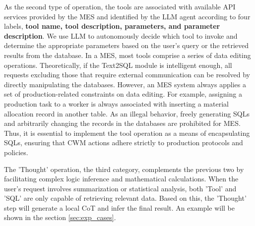 \documentclass[preprint,12pt]{elsarticle}
\begin{document}

As the second type of operation, the tools are associated with available API services provided by the MES and identified by the LLM agent according to four labels, \textbf{tool name, tool description, parameters, and parameter description}. 
We use LLM to autonomously decide which tool to invoke and determine the appropriate parameters based on the user's query or the retrieved results from the database.
In a MES, most tools comprise a series of data editing operations. 
Theoretically, if the Text2SQL module is intelligent enough, all requests excluding those that require external communication can be resolved by directly manipulating the databases.
However, an MES system always applies a set of production-related constraints on data editing.
For example, assigning a production task to a worker is always associated with inserting a material allocation record in another table.
As an illegal behavior, freely generating SQLs and arbitrarily changing the records in the databases are prohibited for MES.
Thus, it is essential to implement the tool operation as a means of encapsulating SQLs, ensuring that CWM actions adhere strictly to production protocols and policies.

The 'Thought' operation, the third category, complements the previous two by facilitating complex logic inference and mathematical calculations.
When the user's request involves summarization or statistical analysis, both 'Tool' and 'SQL' are only capable of retrieving relevant data.
Based on this, the 'Thought' step will generate a local CoT and infer the final result.
An example will be shown in the section \ref{sec:exp_cases}.
\end{document}
